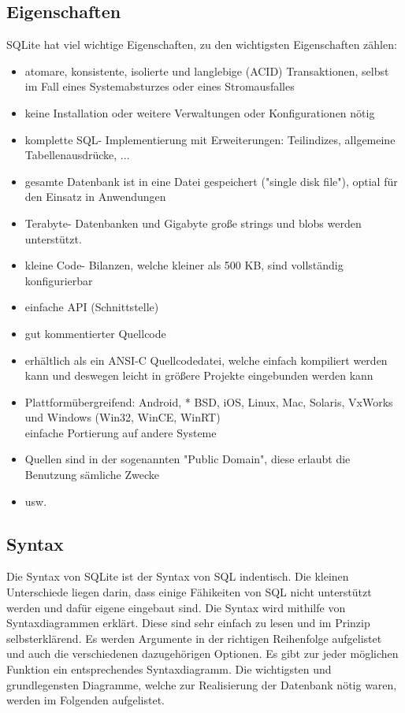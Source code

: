 \documentclass[12pt,a4paper]{report}
\begin{document}
\begin{onehalfspace}
\subsection{Eigenschaften}
SQLite hat viel wichtige Eigenschaften, zu den wichtigsten Eigenschaften zählen:
\begin{itemize}
\item atomare, konsistente, isolierte und langlebige (ACID) Transaktionen, selbst im Fall eines Systemabsturzes oder eines Stromausfalles
\item keine Installation oder weitere Verwaltungen oder Konfigurationen nötig
\item komplette SQL- Implementierung mit Erweiterungen: Teilindizes, allgemeine Tabellenausdrücke, ...
\item gesamte Datenbank ist in eine Datei gespeichert ("{}single disk file"{}), optial für den Einsatz in Anwendungen
\item Terabyte- Datenbanken und Gigabyte große strings und blobs werden unterstützt.
\item kleine Code- Bilanzen, welche kleiner als 500 KB, sind vollständig konfigurierbar
\item einfache API (Schnittstelle)
\item gut kommentierter Quellcode
\item erhältlich als ein ANSI-C Quellcodedatei, welche einfach kompiliert werden kann und deswegen leicht in größere Projekte eingebunden werden kann
\item Plattformübergreifend: Android, * BSD, iOS, Linux, Mac, Solaris, VxWorks und Windows (Win32, WinCE, WinRT)\\
einfache Portierung auf andere Systeme
\item Quellen sind in der sogenannten "{}Public Domain"{}, diese erlaubt die Benutzung sämliche Zwecke
\item usw.
\end{itemize}

\subsection{Syntax}
Die Syntax von SQLite ist der Syntax von SQL indentisch. Die kleinen Unterschiede liegen darin, dass einige Fähikeiten von SQL nicht unterstützt werden und dafür eigene eingebaut sind. Die Syntax wird mithilfe von Syntaxdiagrammen erklärt.
Diese sind sehr einfach zu lesen und im Prinzip selbsterklärend. Es werden Argumente in der richtigen Reihenfolge aufgelistet und auch die verschiedenen dazugehörigen Optionen. Es gibt zur jeder möglichen Funktion ein entsprechendes Syntaxdiagramm. Die wichtigsten und grundlegensten Diagramme, welche zur Realisierung der Datenbank nötig waren, werden im Folgenden aufgelistet.


\end{onehalfspace}
\end{document}
